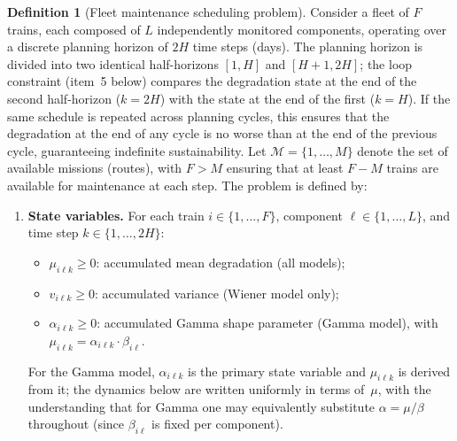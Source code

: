 \documentclass[11pt,a4paper]{article}
\theoremstyle{plain}
\theoremstyle{definition}
\newtheorem{definition}[theorem]{Definition}
\theoremstyle{remark}
\begin{document}
\begin{definition}[Fleet maintenance scheduling problem]\label{def:fleet_problem}
Consider a fleet of $F$ trains, each composed of $L$ independently monitored
components, operating over a discrete planning horizon of $2H$ time steps (days).
The planning horizon is divided into two identical half-horizons $[1,H]$ and $[H{+}1,2H]$;
the loop constraint (item~5 below) compares the degradation state at the end of the
second half-horizon ($k=2H$) with the state at the end of the first ($k=H$).
If the same schedule is repeated across planning cycles, this ensures that the
degradation at the end of any cycle is no worse than at the end of the previous cycle,
guaranteeing indefinite sustainability.
Let $\mathcal{M} = \{1,\ldots,M\}$ denote the set of available missions (routes),
with $F > M$ ensuring that at least $F - M$ trains are available for maintenance
at each step. The problem is defined by:

\begin{enumerate}[nosep,leftmargin=2em]
  \item \textbf{State variables.} For each train $i \in \{1,\ldots,F\}$,
    component $\ell \in \{1,\ldots,L\}$, and time step $k \in \{1,\ldots,2H\}$:
    \begin{itemize}[nosep]
      \item $\mu_{i\ell k} \ge 0$: accumulated mean degradation (all models);
      \item $v_{i\ell k} \ge 0$: accumulated variance (Wiener model only);
      \item $\alpha_{i\ell k} \ge 0$: accumulated Gamma shape parameter (Gamma model),
            with $\mu_{i\ell k} = \alpha_{i\ell k} \cdot \beta_{i\ell}$.
    \end{itemize}
    For the Gamma model, $\alpha_{i\ell k}$ is the primary state variable and $\mu_{i\ell k}$
    is derived from it; the dynamics below are written uniformly in terms of~$\mu$,
    with the understanding that for Gamma one may equivalently substitute
    $\alpha = \mu/\beta$ throughout (since $\beta_{i\ell}$ is fixed per component).


\end{enumerate}
\end{definition}
\end{document}
